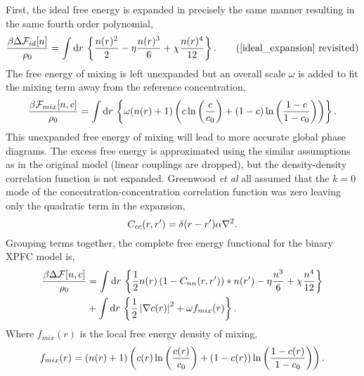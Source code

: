 First, the ideal free energy is expanded in precisely the same manner resulting
in the same fourth order polynomial,
%
\begin{equation}
    \f{\beta\Delta\F_{id}[n]}{\rho_0} = \integrate{r}
        \l\lbrace \f{n(r)^2}{2} - \eta \f{n(r)^3}{6} + \chi\f{n(r)^4}{12}
        \r\rbrace. \tag{\ref{ideal_expansion} revisited}
\end{equation}
%
The free energy of mixing is left unexpanded but an overall scale $\omega$ is
added to fit the mixing term away from the reference concentration,
%
\begin{equation}
    \frac{\beta\mathcal{F}_{mix}[n, c]}{\rho_0} =
        \int \mathrm{d}r\, \left\lbrace \omega (n(r) + 1)\left( 
            c\ln\left(\frac{c}{c_0}\right) + (1-c)\ln\left(\frac{1-c}{1-c_0}\right) \right)\right\rbrace. 
\end{equation}
%
This unexpanded free energy of mixing will lead to more accurate global phase
diagrams. The excess free energy is approximated using the similar assumptions
as in the original model (linear couplings are dropped), but the density-density
correlation function is not expanded. Greenwood \textit{et al} all assumed that
the $k=0$ mode of the concentration-concentration correlation function was zero
leaving only the quadratic term in the expansion,
%
\begin{equation}
    C_{cc}(r, r^\prime) = \delta(r - r^\prime)\alpha \nabla^2.
\end{equation}
%
Grouping terms together, the complete free energy functional for the binary XPFC
model is,
%
\begin{align}
    \frac{\beta\Delta\mathcal{F}[n, c]}{\rho_0} &= \int \mathrm{d}r\, \left\lbrace
        \frac{1}{2} n(r) \left(1 - C_{nn}(r, r^\prime)\right) \ast n(r^\prime)
        - \eta \frac{n^3}{6} + \chi \frac{n^4}{12} \right\rbrace \\
        &+ \int \mathrm{d}r\,\left\lbrace
            \frac{1}{2}\left\vert \nabla c(r) \right\vert^2 + \omega f_{mix}(r)
            \right\rbrace. \nonumber
\end{align}
%
Where $f_{mix}(r)$ is the local free energy density of mixing,
%
\begin{equation}
    f_{mix}(r) = \left(n(r) + 1\right)\left( 
            c(r)\ln\left(\frac{c(r)}{c_0}\right) + (1-c(r))\ln\left(\frac{1-c(r)}{1-c_0}\right) \right).
\end{equation}
%

